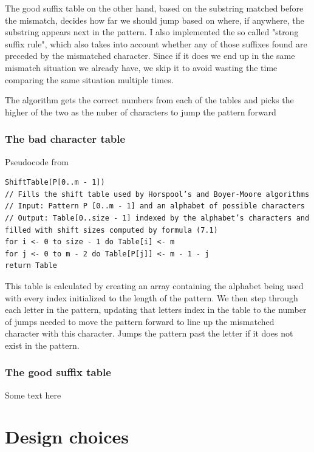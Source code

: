 \documentclass[12pt,a4paper]{article}
\begin{document}
\vspace{5mm}

The good suffix table on the other hand, based on the substring matched before the mismatch, decides how far we should jump based on where, if anywhere, the substring appears next in the pattern. I also implemented the so called "strong suffix rule", which also takes into account whether any of those suffixes found are preceded by the mismatched character. Since if it does we end up in the same mismatch situation we already have, we skip it to avoid wasting the time comparing the same situation multiple times.

The algorithm gets the correct numbers from each of the tables and picks the higher of the two as the nuber of characters to jump the pattern forward

\subsubsection{The bad character table}

Pseudocode from \citep{levitin-2011}
\begin{verbatim}
ShiftTable(P[0..m - 1])
// Fills the shift table used by Horspool’s and Boyer-Moore algorithms
// Input: Pattern P [0..m - 1] and an alphabet of possible characters
// Output: Table[0..size - 1] indexed by the alphabet’s characters and filled with shift sizes computed by formula (7.1)
for i <- 0 to size - 1 do Table[i] <- m
for j <- 0 to m - 2 do Table[P[j]] <- m - 1 - j
return Table
\end{verbatim}

This table is calculated by creating an array containing the alphabet being used with every index initialized to the length of the pattern. We then step through each letter in the pattern, updating that letters index in the table to the number of jumps needed to move the pattern forward to line up the mismatched character with this character. Jumps the pattern past the letter if it does not exist in the pattern.

\subsubsection{The good suffix table}

Some text here

\section{Design choices}
\end{document}
